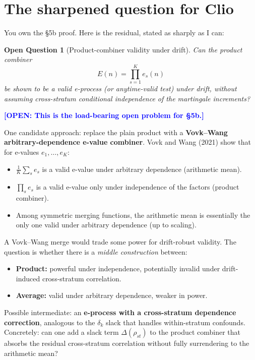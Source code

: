 \documentclass[11pt,a4paper]{article}
\newtheorem{question}[theorem]{Open Question}
\newcommand{\open}[1]{\textcolor{blue}{\textbf{[OPEN: #1]}}}
\begin{document}
\section{The sharpened question for Clio}

You own the \S5b proof.  Here is the residual, stated as sharply as
I can:

\begin{question}[Product-combiner validity under drift]
Can the product combiner
\[
  E(n) = \prod_{s=1}^{K} e_s(n)
\]
be shown to be a valid e-process (or anytime-valid test) under drift,
\emph{without} assuming cross-stratum conditional independence of the
martingale increments?
\end{question}

\open{This is the load-bearing open problem for \S5b.}

One candidate approach: replace the plain product with a
\textbf{Vovk--Wang arbitrary-dependence e-value combiner}.  Vovk and
Wang (2021) show that for e-values $e_1, \ldots, e_K$:
\begin{itemize}[leftmargin=1.5em]
  \item[(a)] $\frac{1}{K}\sum_s e_s$ is a valid e-value under arbitrary
        dependence (arithmetic mean).
  \item[(b)] $\prod_s e_s$ is a valid e-value only under independence
        of the factors (product combiner).
  \item[(c)] Among symmetric merging functions, the arithmetic mean is
        essentially the only one valid under arbitrary dependence
        (up to scaling).
\end{itemize}

A Vovk--Wang merge would trade some power for drift-robust validity.
The question is whether there is a \emph{middle construction} between:
\begin{itemize}[leftmargin=1.5em]
  \item \textbf{Product:} powerful under independence, potentially
        invalid under drift-induced cross-stratum correlation.
  \item \textbf{Average:} valid under arbitrary dependence, weaker
        in power.
\end{itemize}

Possible intermediate: an \textbf{e-process with a cross-stratum
dependence correction}, analogous to the $\delta_k$ slack that handles
within-stratum confounds.  Concretely: can one add a slack term
$\Delta(\rho_{st})$ to the product combiner that absorbs the residual
cross-stratum correlation without fully surrendering to the arithmetic
mean?
\end{document}

